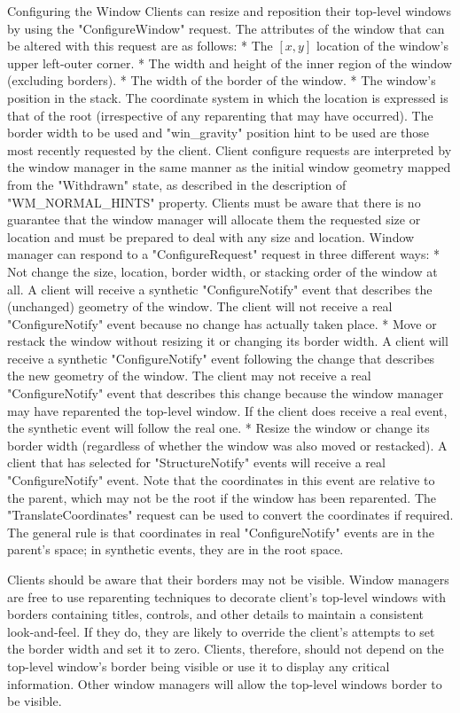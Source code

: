 \secc Configuring the Window
Clients can resize and reposition their top-level windows by using the "ConfigureWindow" request.
The attributes of the window that can be altered with this request are as follows:
\begitems
* The $[x,y]$ location of the window's upper left-outer corner.
* The width and height of the inner region of the window (excluding borders).
* The width of the border of the window.
* The window's position in the stack.
\enditems
The coordinate system in which the location is expressed is that of the root (irrespective of any reparenting that may have occurred).
The border width to be used and "win_gravity" position hint to be used are those most recently requested by the client.
Client configure requests are interpreted by the window manager in the same manner as the initial window geometry mapped from the "Withdrawn" state,
as described in the description of "WM_NORMAL_HINTS" property.
Clients must be aware that there is no guarantee that the window manager will allocate them the requested size or location
and must be prepared to deal with any size and location.
Window manager can respond to a "ConfigureRequest" request in three different ways:
\begitems
* Not change the size, location, border width, or stacking order of the window at all.\nl
A client will receive a synthetic "ConfigureNotify" event that describes the (unchanged) geometry of the window.
The client will not receive a real "ConfigureNotify" event because no change has actually taken place.
* Move or restack the window without resizing it or changing its border width.\nl
A client will receive a synthetic "ConfigureNotify" event following the change that describes the new geometry of the window.
The client may not receive a real "ConfigureNotify" event that describes this change because the window manager may have reparented the top-level window.
If the client does receive a real event, the synthetic event will follow the real one.
* Resize the window or change its border width (regardless of whether the window was also moved or restacked).\nl
A client that has selected for "StructureNotify" events will receive a real "ConfigureNotify" event.
Note that the coordinates in this event are relative to the parent, which may not be the root if the window has been reparented.
The "TranslateCoordinates" request can be used to convert the coordinates if required.
\enditems
The general rule is that coordinates in real "ConfigureNotify" events are in the parent's space; in synthetic events, they are in the root space.

Clients should be aware that their borders may not be visible.
Window managers are free to use reparenting techniques to decorate client's top-level windows with borders containing titles,
controls, and other details to maintain a consistent look-and-feel.
If they do, they are likely to override the client's attempts to set the border width and set it to zero.
Clients, therefore, should not depend on the top-level window's border being visible or use it to display any critical information.
Other window managers will allow the top-level windows border to be visible.
